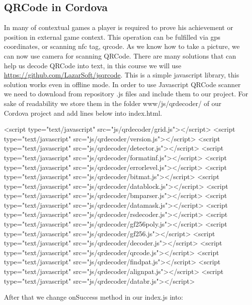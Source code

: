  \subsection{QRCode in Cordova}
 
 In many of contextual games a player is required to prove his achievement or position in external game context. This operation can be fulfilled via gps coordinates, or scanning nfc tag, qrcode. As we know how to take a picture, we can now use camera for scanning QRCode. There are many solutions that can help us decode QRCode into text, in this course we will use \url{https://github.com/LazarSoft/jsqrcode}. This is a simple javascript library, this solution works even in offline mode. In order to use Javascript QRCode scanner  we need to download from repository .js files and include them to our project. For sake of readability we store them in the folder www/js/qrdecoder/ of our Cordova project and add lines below into index.html.
 
\begin{html}
<script type="text/javascript" src="js/qrdecoder/grid.js"></script>
<script type="text/javascript" src="js/qrdecoder/version.js"></script>
<script type="text/javascript" src="js/qrdecoder/detector.js"></script>
<script type="text/javascript" src="js/qrdecoder/formatinf.js"></script>
<script type="text/javascript" src="js/qrdecoder/errorlevel.js"></script>
<script type="text/javascript" src="js/qrdecoder/bitmat.js"></script>
<script type="text/javascript" src="js/qrdecoder/datablock.js"></script>
<script type="text/javascript" src="js/qrdecoder/bmparser.js"></script>
<script type="text/javascript" src="js/qrdecoder/datamask.js"></script>
<script type="text/javascript" src="js/qrdecoder/rsdecoder.js"></script>
<script type="text/javascript" src="js/qrdecoder/gf256poly.js"></script>
<script type="text/javascript" src="js/qrdecoder/gf256.js"></script>
<script type="text/javascript" src="js/qrdecoder/decoder.js"></script>
<script type="text/javascript" src="js/qrdecoder/qrcode.js"></script>
<script type="text/javascript" src="js/qrdecoder/findpat.js"></script>
<script type="text/javascript" src="js/qrdecoder/alignpat.js"></script>
<script type="text/javascript" src="js/qrdecoder/databr.js"></script>
\end{html} 

After that we change onSuccess method in our index.js into:

